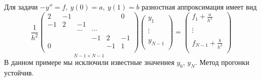 \begin{example}
  Для задачи $-y''=f,\ y(0)=a,\ y(1)=b$ разностная аппроксимация имеет вид
  \[\frac{1}{h^2}\underset{N-1\times N-1}{\left(\begin{array}{cccccc}
        2  & -1 &        &        &    & 0  \\
        -1 & 2  & -1     &        &    &    \\
           &    & \cdots & \cdots &    &    \\
           &    &        & -1     & 2  & -1 \\
        0  &    &        &        & -1 & 1  \\
      \end{array}\right)}
    \left(\begin{array}{c}
        y_{1}   \\
        \\
        \vdots  \\
        \\
        y_{N-1} \\
      \end{array}\right)
    =\left(\begin{array}{c}
        f_{1} +\frac{a}{h^2}   \\
        \\
        \vdots                 \\
        \\
        f_{N-1} +\frac{b}{h^2} \\
      \end{array}\right)
  \]
  В данном примере мы исключили известные значениея $y_0$, $y_N$. Метод прогонки устойчив.
\end{example}

